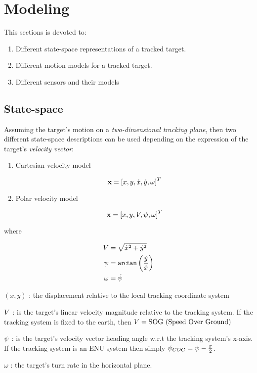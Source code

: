 \chapter{Modeling}
This sections is devoted to:

\begin{enumerate}
	\item Different state-space representations of a tracked target.
	\item Different motion models for a tracked target.
	\item Different sensors and their models	
\end{enumerate}

\section{State-space} \label{sec:SS}
Assuming the target's motion on a \emph{two-dimensional tracking plane}, then two different state-space descriptions can be used depending on the expression of the target's \emph{velocity vector}:

\begin{enumerate}
	\item Cartesian velocity model 
	
	$$\mathbf{x} = \left[x,y,\dot{x}, \dot{y},\omega\right]^{T} $$
		
	\item Polar velocity model 
	
	$$\mathbf{x} = \left[x,y,{V}, {\psi},\omega\right]^{T} $$
		
\end{enumerate}

where

\begin{subequations}
	\begin{align}
		{V} &= \sqrt{\dot{x}^2 + \dot{y}^2}  \\
		{\psi} &= \arctan\left(\frac{\dot{y}}{\dot{x}}\right) \\
		{\omega} &= \dot{{\psi}}
	\end{align}
\end{subequations}

\begin{description}
	\item $(x,y)$ : the displacement relative to the local tracking coordinate system
	\item ${V}$ : is the target's linear velocity magnitude relative to the tracking system. If the tracking system is fixed to the earth, then ${V} = \text{SOG (Speed Over Ground)}$
	\item ${\psi}$ : is the target's velocity vector heading angle w.r.t the tracking system's x-axis. If the tracking system is an ENU system then simply ${\psi}_{COG} = {\psi} - \frac{\pi}{2}$.
	\item $\omega$ : the target's turn rate in the horizontal plane.
\end{description}






